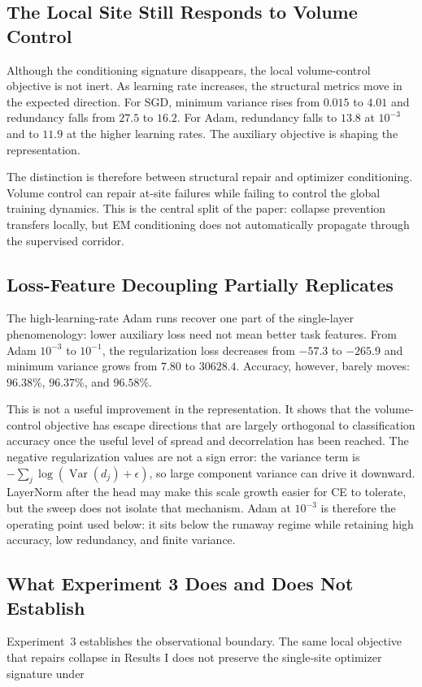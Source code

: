 \subsection{The Local Site Still Responds to Volume Control}
Although the conditioning signature disappears, the local volume-control
objective is not inert. As learning rate increases, the structural metrics
move in the expected direction. For SGD, minimum variance rises from $0.015$
to $4.01$ and redundancy falls from $27.5$ to $16.2$. For Adam, redundancy
falls to $13.8$ at $10^{-3}$ and to $11.9$ at the higher learning rates. The
auxiliary objective is shaping the representation.

The distinction is therefore between structural repair and optimizer
conditioning. Volume control can repair at-site failures while failing to
control the global training dynamics. This is the central split of the paper:
collapse prevention transfers locally, but EM conditioning does not
automatically propagate through the supervised corridor.

\subsection{Loss-Feature Decoupling Partially Replicates}
The high-learning-rate Adam runs recover one part of the single-layer
phenomenology: lower auxiliary loss need not mean better task features. From
Adam $10^{-3}$ to $10^{-1}$, the regularization loss decreases from $-57.3$ to
$-265.9$ and minimum variance grows from $7.80$ to $30628.4$. Accuracy,
however, barely moves: $96.38\%$, $96.37\%$, and $96.58\%$.

This is not a useful improvement in the representation. It shows that the
volume-control objective has escape directions that are largely orthogonal to
classification accuracy once the useful level of spread and decorrelation has
been reached. The negative regularization values are not a sign error: the
variance term is $-\sum_j\log(\operatorname{Var}(d_j)+\epsilon)$, so large
component variance can drive it downward. LayerNorm after the head may make
this scale growth easier for CE to tolerate, but the sweep does not isolate
that mechanism. Adam at $10^{-3}$ is therefore the operating point used below:
it sits below the runaway regime while retaining high accuracy, low
redundancy, and finite variance.

\subsection{What Experiment 3 Does and Does Not Establish}
Experiment~3 establishes the observational boundary. The same local objective
that repairs collapse in Results I does not preserve the single-site optimizer
signature under
